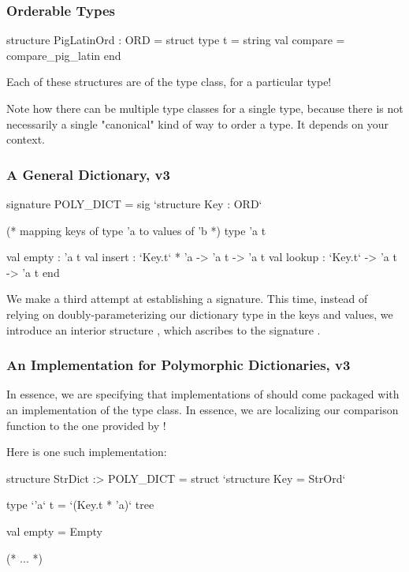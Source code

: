 \documentclass[aspectratio=169]{beamer}
\begin{document}
\begin{frame}[fragile]
  \frametitle{Orderable Types}

  \begin{codeblock}
    structure PigLatinOrd : ORD =
      struct
        type t = string
        val compare = compare_pig_latin 
      end
  \end{codeblock}

  Each of these structures are  of the  type class,
  for a particular type!

  Note how there can be multiple type classes for a single type, because there
  is not necessarily a single "canonical" kind of way to order a type. It depends
  on your context.
\end{frame}

\begin{frame}[fragile]
  \frametitle{A General Dictionary, v3}

  {\small
  \begin{codeblock}
    signature POLY_DICT =
      sig
        `structure Key : ORD`

        (* mapping keys of type 'a to values of 'b *)
        type 'a t

        val empty : 'a t
        val insert : `Key.t` * 'a -> 'a t -> 'a t
        val lookup : `Key.t` -> 'a t -> 'a t
      end
  \end{codeblock}
  }

  We make a third attempt at establishing a  signature.
  This time, instead of relying on doubly-parameterizing our dictionary
  type in the keys and values, we introduce an interior structure
  , which ascribes to the signature .
\end{frame}

\begin{frame}[fragile]
  \frametitle{An Implementation for Polymorphic Dictionaries, v3}

  In essence, we are specifying that implementations of 
  should come packaged with an implementation of the  type class.
  In essence, we are localizing our comparison function to the one provided 
  by !

  Here is one such implementation:

  \begin{codeblock}
    structure StrDict :> POLY_DICT =
      struct
        `structure Key = StrOrd`

        type `'a` t = `(Key.t * 'a)` tree

        val empty = Empty

      (* ... *)
  \end{codeblock}
\end{frame}
\end{document}
